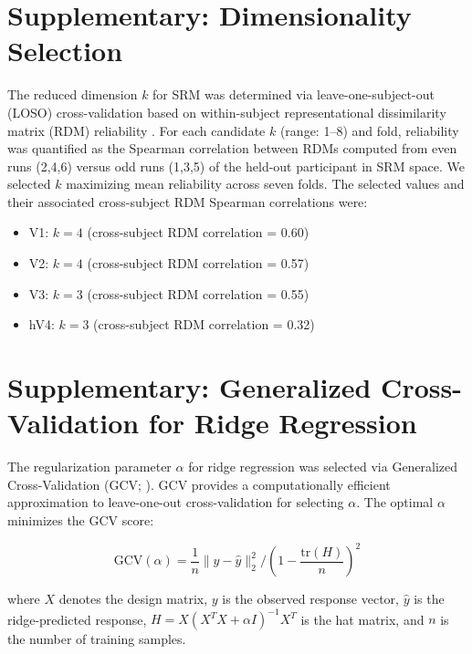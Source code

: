 \documentclass[a4paper,11pt]{article}
\begin{document}

\section*{Supplementary: Dimensionality Selection}

The reduced dimension $k$ for SRM was determined via leave-one-subject-out (LOSO) cross-validation based on within-subject representational dissimilarity matrix (RDM) reliability \cite{cunningham2014}. For each candidate $k$ (range: 1--8) and fold, reliability was quantified as the Spearman correlation between RDMs computed from even runs (2,4,6) versus odd runs (1,3,5) of the held-out participant in SRM space. We selected $k$ maximizing mean reliability across seven folds. The selected values and their associated cross-subject RDM Spearman correlations were:

\begin{itemize}
\item V1: $k = 4$ (cross-subject RDM correlation = 0.60)
\item V2: $k = 4$ (cross-subject RDM correlation = 0.57)
\item V3: $k = 3$ (cross-subject RDM correlation = 0.55)
\item hV4: $k = 3$ (cross-subject RDM correlation = 0.32)
\end{itemize}



\section*{Supplementary: Generalized Cross-Validation for Ridge Regression}

The regularization parameter $\alpha$ for ridge regression was selected via Generalized Cross-Validation (GCV; ). GCV provides a computationally efficient approximation to leave-one-out cross-validation for selecting $\alpha$. The optimal $\alpha$ minimizes the GCV score:

\begin{equation}
\text{GCV}(\alpha) = \frac{1}{n} \|y - \hat{y}\|_2^2 / \left(1 - \frac{\text{tr}(H)}{n}\right)^2
\end{equation}

where $X$ denotes the design matrix, $y$ is the observed response vector, $\hat{y}$ is the ridge-predicted response, $H = X(X^T X + \alpha I)^{-1}X^T$ is the hat matrix, and $n$ is the number of training samples.
\end{document}
